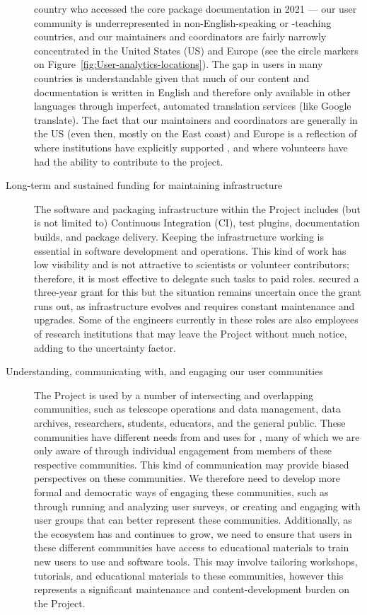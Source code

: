 \documentclass[modern]{aastex631}
\begin{document}
\begin{description}
  country who accessed the \astropypkg core package documentation in 2021 ---
  our user community is underrepresented in non-English-speaking or -teaching
  countries, and our maintainers and coordinators are fairly narrowly
  concentrated in the United States (US) and Europe (see the circle markers on
  Figure~\ref{fig:User-analytics-locations}).
  The gap in users in many countries is understandable given that much of our
  content and documentation is written in English and therefore only available
  in other languages through imperfect, automated translation services (like
  Google translate).
  The fact that our maintainers and coordinators are generally in the US (even
  then, mostly on the East coast) and Europe is a reflection of where
  institutions have explicitly supported \astropy, and where volunteers have had
  the ability to contribute to the project.
  \item[Long-term and sustained funding for maintaining infrastructure] The
  software and packaging infrastructure within the \astropy Project includes
  (but is not limited to) Continuous Integration (CI), test plugins,
  documentation builds, and package delivery.
  Keeping the infrastructure working is essential in software development and
  operations.
  This kind of work has low visibility and is not attractive to scientists or
  volunteer contributors; therefore, it is most effective to delegate such tasks
  to paid roles.
  \astropy secured a three-year grant for this but the situation remains
  uncertain once the grant runs out, as infrastructure evolves and requires
  constant maintenance and upgrades.
  Some of the engineers currently in these roles are also employees of research
  institutions that may leave the Project without much notice, adding to the
  uncertainty factor.
  \item[Understanding, communicating with, and engaging our user communities]
  The \astropy Project is used by a number of intersecting and overlapping
  communities, such as telescope operations and data management, data archives,
  researchers, students, educators, and the general public.
  These communities have different needs from and uses for \astropy, many of
  which we are only aware of through individual engagement from members of these
  respective communities.
  This kind of communication may provide biased perspectives on these
  communities.
  We therefore need to develop more formal and democratic ways of engaging these
  communities, such as through running and analyzing user surveys, or
  creating and engaging with user groups that can better represent these
  communities.
  Additionally, as the \astropy ecosystem has and continues to grow, we need to
  ensure that users in these different communities have access to educational
  materials to train new users to use \astropy and \python software tools.
  This may involve tailoring workshops, tutorials, and educational materials to
  these communities, however this represents a significant maintenance and
  content-development burden on the Project.
\end{description}
\end{document}
